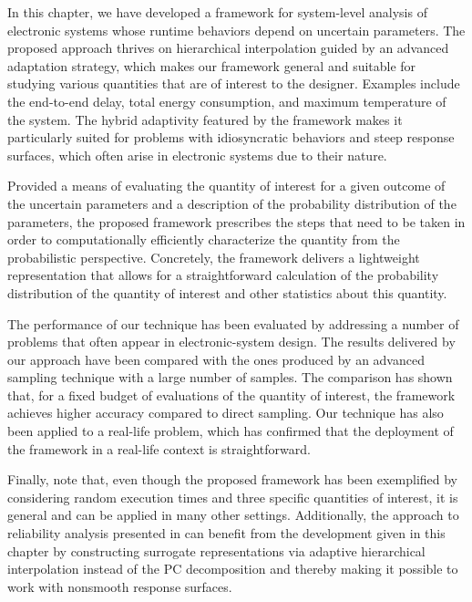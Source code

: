 In this chapter, we have developed a framework for system-level analysis of
electronic systems whose runtime behaviors depend on uncertain parameters. The
proposed approach thrives on hierarchical interpolation guided by an advanced
adaptation strategy, which makes our framework general and suitable for studying
various quantities that are of interest to the designer. Examples include the
end-to-end delay, total energy consumption, and maximum temperature of the
system. The hybrid adaptivity featured by the framework makes it particularly
suited for problems with idiosyncratic behaviors and steep response surfaces,
which often arise in electronic systems due to their nature.

Provided a means of evaluating the quantity of interest for a given outcome of
the uncertain parameters and a description of the probability distribution of
the parameters, the proposed framework prescribes the steps that need to be
taken in order to computationally efficiently characterize the quantity from the
probabilistic perspective. Concretely, the framework delivers a lightweight
representation that allows for a straightforward calculation of the probability
distribution of the quantity of interest and other statistics about this
quantity.

The performance of our technique has been evaluated by addressing a number of
problems that often appear in electronic-system design. The results delivered by
our approach have been compared with the ones produced by an advanced sampling
technique with a large number of samples. The comparison has shown that, for a
fixed budget of evaluations of the quantity of interest, the framework achieves
higher accuracy compared to direct sampling. Our technique has also been applied
to a real-life problem, which has confirmed that the deployment of the framework
in a real-life context is straightforward.

Finally, note that, even though the proposed framework has been exemplified by
considering random execution times and three specific quantities of interest, it
is general and can be applied in many other settings. Additionally, the approach
to reliability analysis presented in  can
benefit from the development given in this chapter by constructing surrogate
representations via adaptive hierarchical interpolation instead of the \ac{PC}
decomposition and thereby making it possible to work with nonsmooth response
surfaces.
